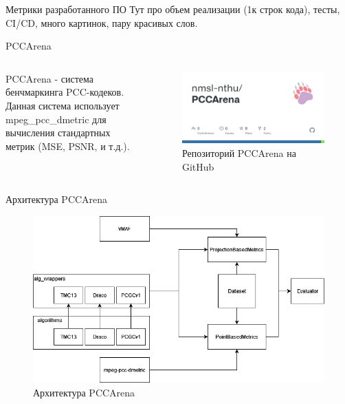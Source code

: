 \documentclass[aspectratio=169]{beamer}
\begin{document}
  \begin{frame}{Метрики разработанного ПО}
  Тут про объем реализации (1к строк кода), тесты, CI/CD, много картинок, пару
  красивых слов.
  \end{frame}

  \begin{frame}{PCCArena}
    \begin{columns}
        PCCArena - система бенчмаркинга PCC-кодеков. Данная система использует
        mpeg\_pcc\_dmetric для вычисления стандартных метрик (MSE, PSNR, и
        т.д.).
        \begin{figure}
          \centering
          \includegraphics[width=\linewidth]{assets/pcc_arena_github.jpg}
          \caption{Репозиторий PCCArena на GitHub}
        \end{figure}
     \end{columns}

  \end{frame}

  \begin{frame}{Архитектура PCCArena}
    \begin{figure}[H]
        \centering
        \includegraphics[width=0.7\linewidth]{assets/pcc_arena_architecture.png}
        \caption{Архитектура PCCArena}
        \label{img:pcc_arena_architecture}
    \end{figure}
  \end{frame}
\end{document}
